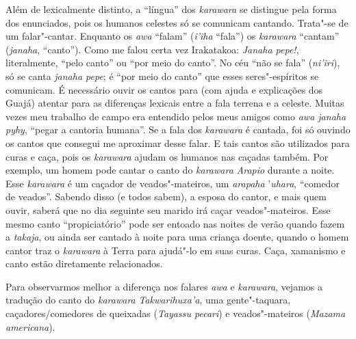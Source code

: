 Além de lexicalmente distinto, a ``língua'' dos \emph{karawara} se
distingue pela forma dos enunciados, pois os humanos celestes só se
comunicam cantando. Trata"-se de um falar"-cantar. Enquanto os \emph{awa}
``falam'' (\emph{i'ĩha} ``fala'') os \emph{karawara} ``cantam''
(\emph{janaha}, ``canto''). Como me falou certa vez Irakatakoa:
\emph{Janaha pepe!}, literalmente, ``pelo canto'' ou ``por meio do
canto''. No céu ``não se fala'' (\emph{ni'ĩri}), só se canta
\emph{janaha pepe}; é ``por meio do canto'' que esses seres"-espíritos se
comunicam. É necessário ouvir os cantos para (com ajuda e explicações
dos Guajá) atentar para as diferenças lexicais entre a fala terrena e a
celeste. Muitas vezes meu trabalho de campo era entendido pelos meus
amigos como \emph{awa janaha pyhy}, ``pegar a cantoria humana''. Se a fala
dos \emph{karawara} é cantada, foi só ouvindo os cantos que consegui me
aproximar desse falar. E tais cantos são utilizados para curas e caça,
pois os \emph{karawara} ajudam os humanos nas caçadas também. Por
exemplo, um homem pode cantar o canto do \emph{karawara} \emph{Arapio}
durante a noite. Esse \emph{karawara} é um caçador de veados"-mateiros,
um \emph{arapaha} '\emph{uhara}, ``comedor de veados''. Sabendo disso (e
todos sabem), a esposa do cantor, e mais quem ouvir, saberá que no dia
seguinte seu marido irá caçar veados"-mateiros. Esse mesmo canto
``propiciatório'' pode ser entoado nas noites de verão quando fazem a
\emph{takaja}, ou ainda ser cantado à noite para uma criança doente,
quando o homem cantor traz o \emph{karawara} à Terra para ajudá"-lo em
suas curas. Caça, xamanismo e canto estão diretamente relacionados.

Para observarmos melhor a diferença nos falares \emph{awa} e
\emph{karawara}, vejamos a tradução do canto do \emph{karawara}
\emph{Takwarihuxa'a}, uma gente"-taquara, caçadores/comedores de
queixadas (\emph{Tayassu pecari}) e veados"-mateiros (\emph{Mazama
americana}).

